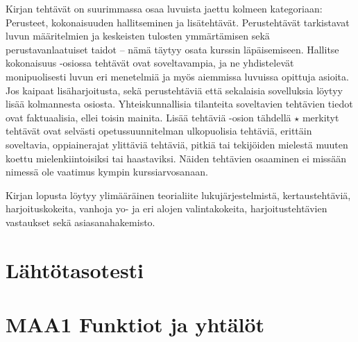 Kirjan tehtävät on suurimmassa osaa luvuista jaettu kolmeen kategoriaan: Perusteet, kokonaisuuden hallitseminen ja lisätehtävät. Perustehtävät tarkistavat luvun määritelmien ja keskeisten tulosten ymmärtämisen sekä perustavanlaatuiset taidot -- nämä täytyy osata kurssin läpäisemiseen. Hallitse kokonaisuus -osiossa tehtävät ovat soveltavampia, ja ne yhdistelevät monipuolisesti luvun eri menetelmiä ja myös aiemmissa luvuissa opittuja asioita. Jos kaipaat lisäharjoitusta, sekä perustehtäviä että sekalaisia sovelluksia löytyy lisää kolmannesta osiosta. Yhteiskunnallisia tilanteita soveltavien tehtävien tiedot ovat faktuaalisia, ellei toisin mainita. Lisää tehtäviä -osion tähdellä $\star$ merkityt tehtävät ovat selvästi opetussuunnitelman ulkopuolisia tehtäviä, erittäin soveltavia, oppiainerajat ylittäviä tehtäviä, pitkiä tai tekijöiden mielestä muuten koettu mielenkiintoisiksi tai haastaviksi. Näiden tehtävien osaaminen ei missään nimessä ole vaatimus kympin kurssiarvosanaan.

Kirjan lopusta löytyy ylimääräinen teorialiite lukujärjestelmistä, kertaustehtäviä, harjoituskokeita, vanhoja yo- ja eri alojen valintakokeita, harjoitustehtävien vastaukset sekä asiasanahakemisto.

\newpage

\section*{Lähtötasotesti}

\newpage

\section*{MAA1 Funktiot ja yhtälöt}



